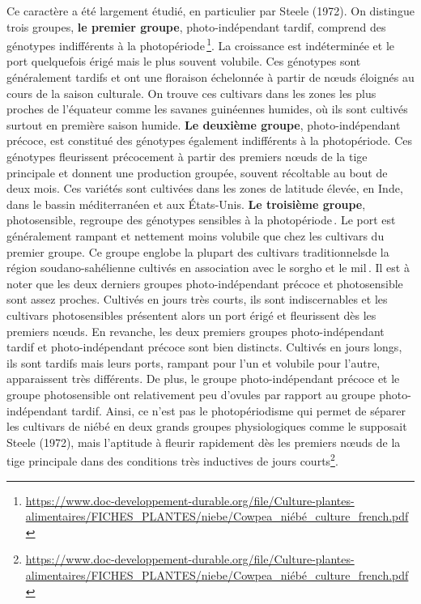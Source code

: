 \documentclass[a4paper,11pt]{article}
\begin{document}
Ce caractère a été largement étudié, en particulier par Steele
(1972). On distingue trois groupes, \textbf{le premier groupe},
photo-indépendant tardif, comprend des génotypes indifférents à la
photopériode\,\footnote{\url{https://www.doc-developpement-durable.org/file/Culture-plantes-alimentaires/FICHES_PLANTES/niebe/Cowpea_niébé_culture_french.pdf}}. La
croissance est indéterminée et le port quelquefois érigé mais le plus
souvent volubile. Ces génotypes sont généralement tardifs et ont une
floraison échelonnée à partir de nœuds éloignés au cours de la saison
culturale. On trouve ces cultivars dans les zones les plus proches de
l’équateur comme les savanes guinéennes humides, où ils sont cultivés
surtout en première saison humide. \textbf{Le deuxième groupe},
photo-indépendant précoce, est constitué des génotypes également
indifférents à la photopériode. Ces génotypes fleurissent précocement
à partir des premiers nœuds de la tige principale et donnent une
production groupée, souvent récoltable au bout de deux mois. Ces
variétés sont cultivées dans les zones de latitude élevée, en Inde,
dans le bassin méditerranéen et aux États-Unis. \textbf{Le troisième
groupe}, photosensible, regroupe des génotypes sensibles à la
photopériode\,\cite{Steele_1972}. Le port est généralement rampant et
nettement moins volubile que chez les cultivars du premier groupe. Ce
groupe englobe la plupart des cultivars traditionnelsde la région
soudano-sahélienne cultivés en association avec le sorgho et le
mil\,\cite{Doggett_1988}. Il est à noter que les deux derniers groupes
photo-indépendant précoce et photosensible sont assez
proches. Cultivés en jours très courts, ils sont indiscernables et les
cultivars photosensibles présentent alors un port érigé et fleurissent
dès les premiers nœuds. En revanche, les deux premiers groupes
photo-indépendant tardif et photo-indépendant précoce sont bien
distincts. Cultivés en jours longs, ils sont tardifs mais leurs ports,
rampant pour l’un et volubile pour l’autre, apparaissent très
différents. De plus, le groupe photo-indépendant précoce et le groupe
photosensible ont relativement peu d’ovules par rapport au groupe
photo-indépendant tardif. Ainsi, ce n’est pas le photopériodisme qui
permet de séparer les cultivars de niébé en deux grands groupes
physiologiques comme le supposait Steele (1972), mais l’aptitude à
fleurir rapidement dès les premiers nœuds de la tige principale dans
des conditions très inductives de jours
courts\footnote{\url{https://www.doc-developpement-durable.org/file/Culture-plantes-alimentaires/FICHES_PLANTES/niebe/Cowpea_niébé_culture_french.pdf}}.
\end{document}
